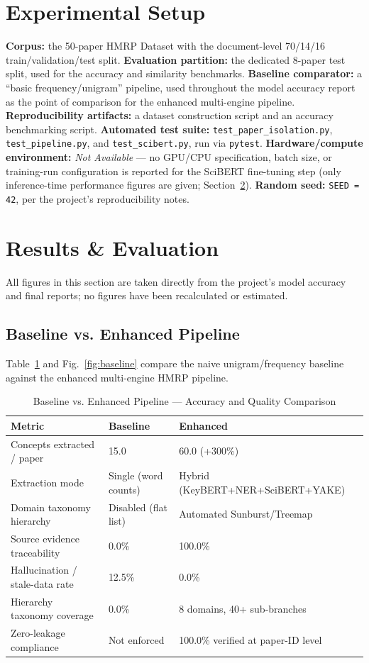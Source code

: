 \documentclass[10pt,conference]{IEEEtran}
\begin{document}
\section{Experimental Setup}
\textbf{Corpus:} the 50-paper HMRP Dataset with the document-level 70/14/16 train/validation/test split. \textbf{Evaluation partition:} the dedicated 8-paper test split, used for the accuracy and similarity benchmarks. \textbf{Baseline comparator:} a ``basic frequency/unigram'' pipeline, used throughout the model accuracy report as the point of comparison for the enhanced multi-engine pipeline. \textbf{Reproducibility artifacts:} a dataset construction script and an accuracy benchmarking script. \textbf{Automated test suite:} \texttt{test\_paper\_isolation.py}, \texttt{test\_pipeline.py}, and \texttt{test\_scibert.py}, run via \texttt{pytest}. \textbf{Hardware/compute environment:} \emph{Not Available} --- no GPU/CPU specification, batch size, or training-run configuration is reported for the SciBERT fine-tuning step (only inference-time performance figures are given; Section~\ref{sec:results}). \textbf{Random seed:} \texttt{SEED = 42}, per the project's reproducibility notes.

\section{Results \& Evaluation}
\label{sec:results}
All figures in this section are taken directly from the project's model accuracy and final reports; no figures have been recalculated or estimated.

\subsection{Baseline vs. Enhanced Pipeline}
Table~\ref{tab:baseline} and Fig.~\ref{fig:baseline} compare the naive unigram/frequency baseline against the enhanced multi-engine HMRP pipeline.

\begin{table}[t]
\caption{Baseline vs. Enhanced Pipeline --- Accuracy and Quality Comparison}
\label{tab:baseline}
\centering
\small
\begin{tabular}{@{}p{}p{}p{}@{}}
\toprule
\textbf{Metric} & \textbf{Baseline} & \textbf{Enhanced} \\
\midrule
Concepts extracted / paper & 15.0 & 60.0 (+300\%) \\
Extraction mode & Single (word counts) & Hybrid (KeyBERT+NER+SciBERT+YAKE) \\
Domain taxonomy hierarchy & Disabled (flat list) & Automated Sunburst/Treemap \\
Source evidence traceability & 0.0\% & 100.0\% \\
Hallucination / stale-data rate & 12.5\% & 0.0\% \\
Hierarchy taxonomy coverage & 0.0\% & 8 domains, 40+ sub-branches \\
Zero-leakage compliance & Not enforced & 100.0\% verified at paper-ID level \\
\bottomrule
\end{tabular}
\end{table}
\end{document}
